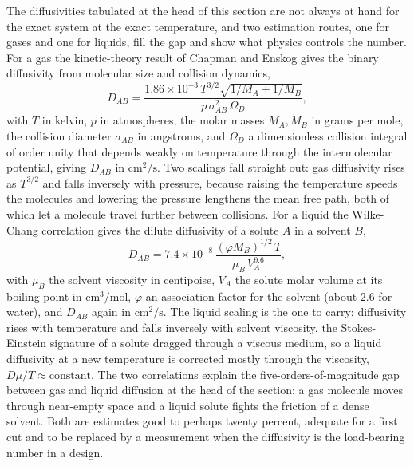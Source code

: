 \begin{mastery}
The diffusivities tabulated at the head of this section are not always at
hand for the exact system at the exact temperature, and two estimation
routes, one for gases and one for liquids, fill the gap and show what
physics controls the number. For a gas the kinetic-theory result of
Chapman and Enskog gives the binary diffusivity from molecular size and
collision dynamics,
\[
D_{AB} = \frac{1.86\times 10^{-3}\,T^{3/2}\sqrt{1/M_A + 1/M_B}}
{p\,\sigma_{AB}^2\,\Omega_D},
\]
with $T$ in kelvin, $p$ in atmospheres, the molar masses $M_A,M_B$ in
grams per mole, the collision diameter $\sigma_{AB}$ in angstroms, and
$\Omega_D$ a dimensionless collision integral of order unity that depends
weakly on temperature through the intermolecular potential, giving
$D_{AB}$ in $\text{cm}^2/\text{s}$. Two scalings fall straight out: gas
diffusivity rises as $T^{3/2}$ and falls inversely with pressure, because
raising the temperature speeds the molecules and lowering the pressure
lengthens the mean free path, both of which let a molecule travel further
between collisions. For a liquid the Wilke-Chang correlation gives the
dilute diffusivity of a solute $A$ in a solvent $B$,
\[
D_{AB} = 7.4\times 10^{-8}\,\frac{(\varphi M_B)^{1/2}\,T}{\mu_B\,V_A^{0.6}},
\]
with $\mu_B$ the solvent viscosity in centipoise, $V_A$ the solute molar
volume at its boiling point in $\text{cm}^3/\text{mol}$, $\varphi$ an
association factor for the solvent (about $2.6$ for water), and $D_{AB}$
again in $\text{cm}^2/\text{s}$. The liquid scaling is the one to carry:
diffusivity rises with temperature and falls inversely with solvent
viscosity, the Stokes-Einstein signature of a solute dragged through a
viscous medium, so a liquid diffusivity at a new temperature is corrected
mostly through the viscosity, $D\mu/T \approx \text{constant}$. The two
correlations explain the five-orders-of-magnitude gap between gas and
liquid diffusion at the head of the section: a gas molecule moves through
near-empty space and a liquid solute fights the friction of a dense
solvent. Both are estimates good to perhaps twenty percent, adequate for a
first cut and to be replaced by a measurement when the diffusivity is the
load-bearing number in a design.
\end{mastery}

